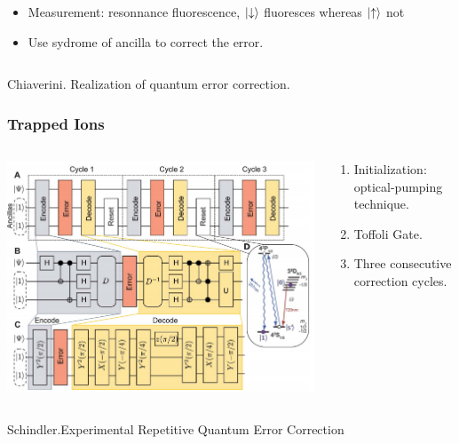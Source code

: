 \documentclass[aspectratio=169,10pt]{beamer}
\begin{document}
\begin{frame}
\begin{columns}
\begin{column}{0.55\textwidth}
            \begin{itemize}
                \item Measurement: resonnance fluorescence, $\ket{\downarrow}$ fluoresces whereas $\ket{\uparrow}$ not
                \item Use sydrome of ancilla to correct the error.
            \end{itemize}
        \end{column}
    \end{columns}
\tiny{Chiaverini. Realization of quantum error correction.}
\end{frame}
\begin{frame}
    \frametitle{Trapped Ions}
    \begin{columns}
        \begin{column}{0.55\textwidth}
            \centering
            \includegraphics[width=\columnwidth]{figure/qec2.png}
        \end{column}
        \begin{column}{0.45\textwidth}
            \begin{enumerate}
                \item Initialization: optical-pumping technique.
                \item Toffoli Gate.
                \item Three consecutive correction cycles.
            \end{enumerate}
        \end{column}
    \end{columns}
\tiny{Schindler.Experimental Repetitive Quantum Error Correction}
\end{frame}
\end{document}

